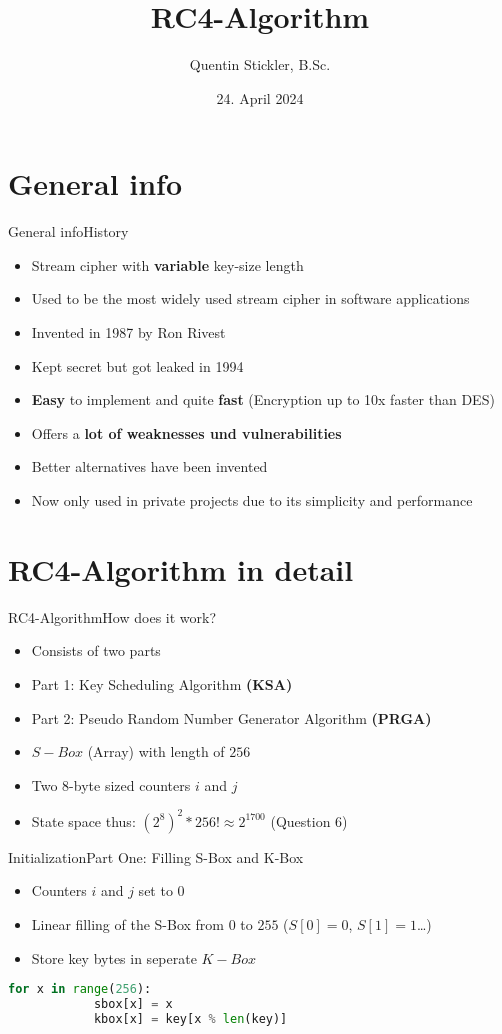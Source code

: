 \documentclass[
	aspectratio=169,	%
	onlytextwidth,		%
	t,					%
	]{beamer}
\title[RC4-Algorithm]{RC4-Algorithm}
\author[Quentin Stickler]{Quentin Stickler, B.Sc.}
\date{24. April 2024} %
\begin{document}
\section{General info}

\begin{frame}[fragile]{General info}{History}
	\begin{itemize}
		\item Stream cipher with \textbf{variable} key-size length
		\item Used to be the most widely used stream cipher in software applications
		\item Invented in 1987 by Ron Rivest
		\item Kept secret but got leaked in 1994
		\item \textbf{Easy} to implement and quite \textbf{fast} (Encryption up to 10x faster than DES)
		\item Offers a \textbf{lot of weaknesses und vulnerabilities}
		\item Better alternatives have been invented
		\item Now only used in private projects due to its simplicity and performance
	\end{itemize}
\end{frame}

\section{RC4-Algorithm in detail}

\begin{frame}[fragile]{RC4-Algorithm}{How does it work?}
	\begin{itemize}
		\item Consists of two parts
		\item Part 1: Key Scheduling Algorithm \textbf{(KSA)}
		\item Part 2: Pseudo Random Number Generator Algorithm \textbf{(PRGA)}
		\item $S-Box$ (Array) with length of $256$
		\item Two 8-byte sized counters $i$ and $j$
		\item State space thus: $(2^{8})^2 * 256! \approx 2^{1700}$ (Question 6)
	\end{itemize}
\end{frame}

\begin{frame}[fragile]{Initialization}{Part One: Filling S-Box and K-Box}
	\begin{itemize}
		\item Counters $i$ and $j$ set to $0$
		\item Linear filling of the S-Box from $0$ to $255$ ($S[0] = 0$, $S[1] = 1$\dots)
		\item Store key bytes in seperate $K-Box$
	\end{itemize}
	\begin{lstlisting}[language=Python]
		for x in range(256):
			sbox[x] = x
			kbox[x] = key[x % len(key)]
	\end{lstlisting}
\end{frame}
\end{document}
